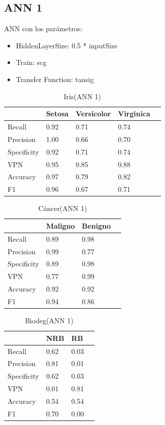 \documentclass[a4paper,openwrite,12pt]{article}
\begin{document}
\subsection{ANN 1}
ANN con los parámetros:
\begin{itemize}
    \item HiddenLayerSize: 0.5 * inputSize
    \item Train: scg
    \item Transfer Function: tansig
\end{itemize}

\begin{table}[H]
\centering
\begin{tabular}{@{}lllll@{}}
\toprule
            & Setosa & Versicolor & Virginica &  \\ \midrule
Recall      & 0.92   & 0.71       & 0.74      &  \\
Precision   & 1.00   & 0.66       & 0.70      &  \\
Specificity & 0.92   & 0.71       & 0.74      &  \\
VPN         & 0.95   & 0.85       & 0.88      &  \\
Accuracy    & 0.97   & 0.79       & 0.82      &  \\
F1          & 0.96   & 0.67       & 0.71      &  \\ \bottomrule
\end{tabular}
\caption{Iris(ANN 1)}
\end{table}


\begin{table}[H]
\centering
\begin{tabular}{@{}llll@{}}
\toprule
            & Maligno & Benigno &  \\ \midrule
Recall      & 0.89    & 0.98    &  \\
Precision   & 0.99    & 0.77    &  \\
Specificity & 0.89    & 0.98    &  \\
VPN         & 0.77    & 0.99    &  \\
Accuracy    & 0.92    & 0.92    &  \\
F1          & 0.94    & 0.86    &  \\ \bottomrule
\end{tabular}
\caption{Cáncer(ANN 1)}
\end{table}

\begin{table}[H]
\centering
\begin{tabular}{@{}llll@{}}
\toprule
            & NRB &   RB &  \\ \midrule
Recall      & 0.62    & 0.03    &  \\
Precision   & 0.81    & 0.01    &  \\
Specificity & 0.62    & 0.03    &  \\
VPN         & 0.01    & 0.81    &  \\
Accuracy    & 0.54    & 0.54    &  \\
F1          & 0.70    & 0.00    &  \\ \bottomrule
\end{tabular}
\caption{Biodeg(ANN 1)}
\end{table}
\end{document}
